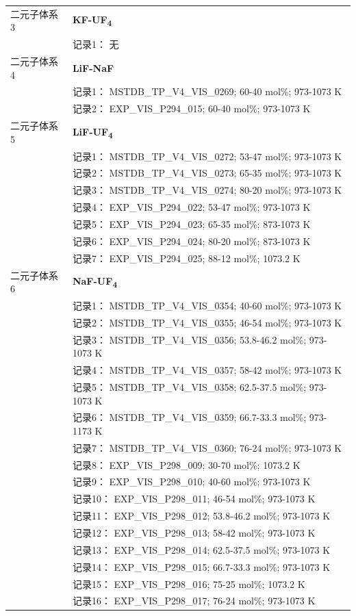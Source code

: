 \documentclass[12pt]{article}
\begin{document}
{\begin{longtable}[]{@{}
  >{\raggedright\arraybackslash}p{}
  >{\raggedright\arraybackslash}p{}@{}}
二元子体系 3 & \textbf{KF-UF\textsubscript{4}} \\
 & 记录1： 无 \\
二元子体系 4  & \textbf{LiF-NaF} \\
 & 记录1： MSTDB\_TP\_V4\_VIS\_0269; 60-40 mol\%; 973-1073 K \\
 & 记录2： EXP\_VIS\_P294\_015; 60-40 mol\%; 973-1073 K  \\

二元子体系 5  & \textbf{LiF-UF\textsubscript{4}} \\
 & 记录1： MSTDB\_TP\_V4\_VIS\_0272; 53-47 mol\%; 973-1073 K \\
 & 记录2： MSTDB\_TP\_V4\_VIS\_0273; 65-35 mol\%; 973-1073 K \\
 & 记录3： MSTDB\_TP\_V4\_VIS\_0274; 80-20 mol\%; 973-1073 K \\
 & 记录4： EXP\_VIS\_P294\_022; 53-47 mol\%; 973-1073 K \\
 & 记录5： EXP\_VIS\_P294\_023; 65-35 mol\%; 873-1073 K \\
 & 记录6： EXP\_VIS\_P294\_024; 80-20 mol\%; 873-1073 K \\
 & 记录7： EXP\_VIS\_P294\_025; 88-12 mol\%; 1073.2 K  \\

二元子体系 6  & \textbf{NaF-UF\textsubscript{4}} \\
 & 记录1： MSTDB\_TP\_V4\_VIS\_0354; 40-60 mol\%; 973-1073 K \\
 & 记录2： MSTDB\_TP\_V4\_VIS\_0355; 46-54 mol\%; 973-1073 K \\
 & 记录3： MSTDB\_TP\_V4\_VIS\_0356; 53.8-46.2 mol\%; 973-1073 K \\
 & 记录4： MSTDB\_TP\_V4\_VIS\_0357; 58-42 mol\%; 973-1073 K \\
 & 记录5： MSTDB\_TP\_V4\_VIS\_0358; 62.5-37.5 mol\%; 973-1073 K \\
 & 记录6： MSTDB\_TP\_V4\_VIS\_0359; 66.7-33.3 mol\%; 973-1173 K \\
 & 记录7： MSTDB\_TP\_V4\_VIS\_0360; 76-24 mol\%; 973-1073 K \\
 & 记录8： EXP\_VIS\_P298\_009; 30-70 mol\%; 1073.2 K \\
 & 记录9： EXP\_VIS\_P298\_010; 40-60 mol\%; 973-1073 K \\
 & 记录10： EXP\_VIS\_P298\_011; 46-54 mol\%; 973-1073 K \\
 & 记录11： EXP\_VIS\_P298\_012; 53.8-46.2 mol\%; 973-1073 K \\
 & 记录12： EXP\_VIS\_P298\_013; 58-42 mol\%; 973-1073 K \\
 & 记录13： EXP\_VIS\_P298\_014; 62.5-37.5 mol\%; 973-1073 K \\
 & 记录14： EXP\_VIS\_P298\_015; 66.7-33.3 mol\%; 973-1073 K \\
 & 记录15： EXP\_VIS\_P298\_016; 75-25 mol\%; 1073.2 K \\
 & 记录16： EXP\_VIS\_P298\_017; 76-24 mol\%; 973-1073 K  \\


\end{longtable}}
\end{document}
